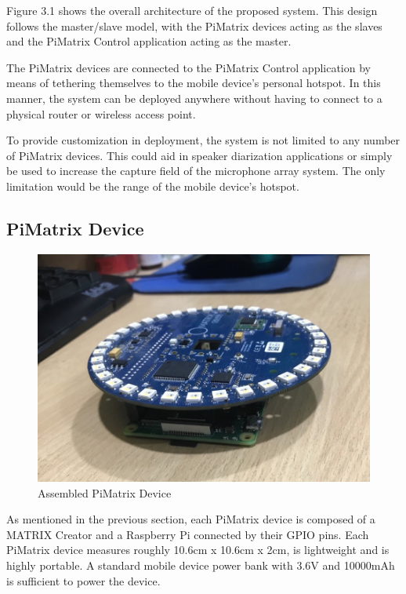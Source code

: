 \documentclass[hidelinks,12pt]{report} %
\begin{document}
Figure 3.1 shows the overall architecture of the proposed system. This design follows the master/slave model, with the PiMatrix devices acting as the slaves and the PiMatrix Control application acting as the master. 

The PiMatrix devices are connected to the PiMatrix Control application by means of tethering themselves to the mobile device’s personal hotspot. In this manner, the system can be deployed anywhere without having to connect to a physical router or wireless access point.  

To provide customization in deployment, the system is not limited to any number of PiMatrix devices. This could aid in speaker diarization applications or simply be used to increase the capture field of the microphone array system. The only limitation would be the range of the mobile device’s hotspot. 

\subsection{PiMatrix Device}

\begin{figure}[h]
\centering
\includegraphics[scale = 1.0]{fig3.2} 
\caption{Assembled PiMatrix Device}
\label{fig}
\end{figure}

As mentioned in the previous section, each PiMatrix device is composed of a MATRIX Creator and a Raspberry Pi connected by their GPIO pins. Each PiMatrix device measures roughly 10.6cm x 10.6cm x 2cm, is lightweight and is highly portable. A standard mobile device power bank with 3.6V and 10000mAh is sufficient to power the device.
\end{document}
